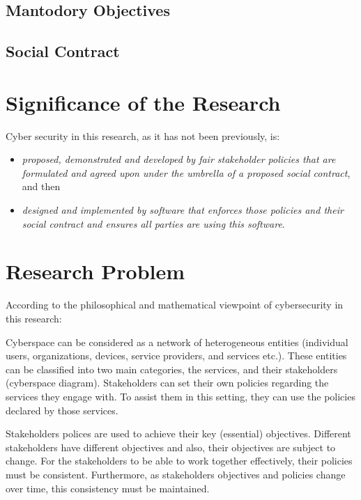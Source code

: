 \subsection{Mantodory Objectives}
\subsection{Social Contract}

\section{Significance of the Research}
Cyber security in this research, as it has not been previously, is:
\begin{flushleft}
\begin{itemize}

\item \emph{proposed, demonstrated and developed by fair stakeholder policies that are formulated and agreed upon under the umbrella of a proposed social contract}, and then
\item  \emph{designed and implemented by software that enforces those policies and their social contract and ensures  all parties are using this software}.
\end{itemize}

\end{flushleft}
\section{Research Problem}
According to the philosophical and mathematical viewpoint of cybersecurity in this research:

Cyberspace can be considered as a network of heterogeneous entities
(individual users, organizations, devices, service providers, and
services etc.). These entities can be classified into two main categories,
the services, and their stakeholders (cyberspace diagram).  Stakeholders
can set their own policies regarding the services they engage with. To
assist them in this setting, they can use the policies declared by
those services.

Stakeholders polices are used to achieve their key (essential)
objectives. Different stakeholders have different objectives and also,
their objectives are subject to change.  For the stakeholders to be
able to work together effectively, their policies must be consistent.
Furthermore, as stakeholders objectives and policies change over time,
this consistency must be maintained.

